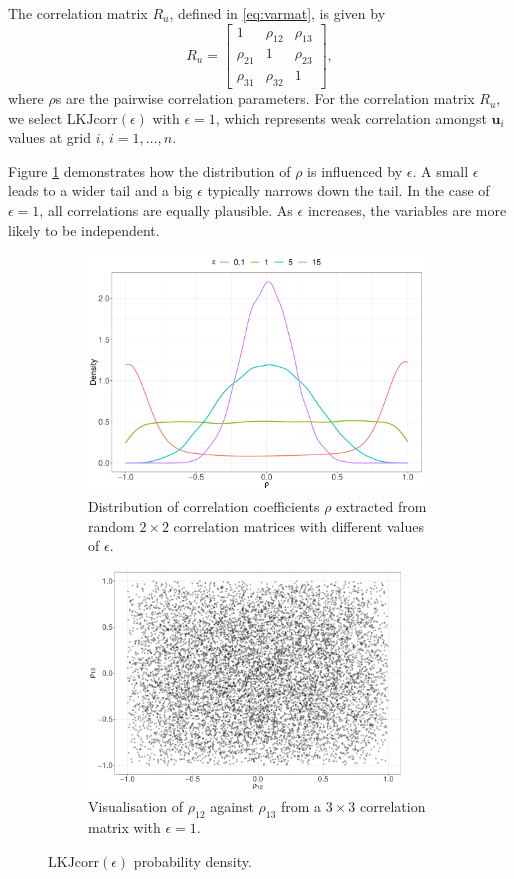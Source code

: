 \documentclass[a4paper]{article}   	%
\begin{document}
	The correlation matrix $R_u$, defined in \eqref{eq:varmat}, is given by
	\begin{equation}\label{eq:RMat}
		R_u = \begin{bmatrix}
			1 & \rho_{12} &\rho_{13}  \\ \rho_{21} & 1 & \rho_{23} \\ \rho_{31} & \rho_{32} & 1 
		\end{bmatrix},
	\end{equation}
	where $\rho$s are the pairwise correlation parameters. For the correlation matrix $R_u$, we select $\mbox{LKJcorr}(\epsilon)$ with $\epsilon = 1$, which represents weak correlation amongst $\bm{u}_i$ values at grid $i$, $i=1,\ldots, n$.  
	
	Figure \ref{fig:LKJdensity} demonstrates how the distribution of $\rho$ is influenced by $\epsilon$. A small $\epsilon$ leads to a wider tail and a big $\epsilon$ typically narrows down the tail. In the case of $\epsilon = 1$, all correlations are equally plausible. As $\epsilon$ increases, the variables are more likely to be independent. 
	
	\begin{figure}[!htp]
		\centering	
		\begin{subfigure}[t]{0.45\textwidth}
			\centering
			\includegraphics[height=6.3cm,width=\linewidth]{Images/LKJdensity}
			\caption{Distribution of correlation coefficients $\rho$ extracted from random $2\times2$ correlation matrices with different values of $\epsilon$.}
		\end{subfigure} 
		\space
		\begin{subfigure}[t]{0.45\textwidth}
			\centering
			\includegraphics[height=5.9cm,width=\linewidth]{Images/LKJdensity2D}
			\caption{Visualisation of $\rho_{12}$ against $\rho_{13}$ from a $3\times3$ correlation matrix with $\epsilon=1$.}
		\end{subfigure}
		\caption{$\text{LKJcorr}(\epsilon)$ probability density. }\label{fig:LKJdensity}
	\end{figure}
	
\end{document}
